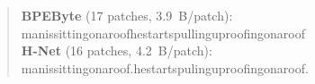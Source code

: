 \begin{quote}
\textbf{BPEByte} (17 patches, 3.9~B/patch):\\[1pt]
\allowbreak{}\bb{\textvisiblespace{}}\allowbreak{}m\allowbreak{}a\allowbreak{}n\allowbreak{}\bb{\textvisiblespace{}}\allowbreak{}i\allowbreak{}s\allowbreak{}\bb{\textvisiblespace{}}\allowbreak{}s\allowbreak{}i\allowbreak{}t\allowbreak{}t\allowbreak{}i\allowbreak{}n\allowbreak{}g\allowbreak{}\bb{\textvisiblespace{}}\allowbreak{}o\allowbreak{}n\allowbreak{}\bb{\textvisiblespace{}}\allowbreak{}a\allowbreak{}\bb{\textvisiblespace{}}\allowbreak{}r\allowbreak{}o\allowbreak{}o\allowbreak{}f\allowbreak{}\allowbreak{}\bb{\textvisiblespace{}}\allowbreak{}h\allowbreak{}e\allowbreak{}\bb{\textvisiblespace{}}\allowbreak{}s\allowbreak{}t\allowbreak{}a\allowbreak{}r\allowbreak{}t\allowbreak{}s\allowbreak{}\bb{\textvisiblespace{}}\allowbreak{}p\allowbreak{}u\allowbreak{}l\allowbreak{}l\allowbreak{}i\allowbreak{}n\allowbreak{}g\allowbreak{}\bb{\textvisiblespace{}}\allowbreak{}u\allowbreak{}p\allowbreak{}\bb{\textvisiblespace{}}\allowbreak{}r\allowbreak{}o\allowbreak{}o\allowbreak{}f\allowbreak{}i\allowbreak{}n\allowbreak{}g\allowbreak{}\bb{\textvisiblespace{}}\allowbreak{}o\allowbreak{}n\allowbreak{}\bb{\textvisiblespace{}}\allowbreak{}a\allowbreak{}\bb{\textvisiblespace{}}\allowbreak{}r\allowbreak{}o\allowbreak{}o\allowbreak{}f\allowbreak{}\allowbreak{}\\[6pt]
\textbf{H-Net} (16 patches, 4.2~B/patch):\\[1pt]
\allowbreak{}\bb{\textvisiblespace{}}\allowbreak{}m\allowbreak{}a\allowbreak{}n\allowbreak{}\bb{\textvisiblespace{}}\allowbreak{}i\allowbreak{}s\allowbreak{}\bb{\textvisiblespace{}}\allowbreak{}s\allowbreak{}i\allowbreak{}t\allowbreak{}t\allowbreak{}i\allowbreak{}n\allowbreak{}g\allowbreak{}\bb{\textvisiblespace{}}\allowbreak{}o\allowbreak{}n\allowbreak{}\bb{\textvisiblespace{}}\allowbreak{}a\allowbreak{}\bb{\textvisiblespace{}}\allowbreak{}r\allowbreak{}o\allowbreak{}o\allowbreak{}f\allowbreak{}.\allowbreak{}\bb{\textvisiblespace{}}\allowbreak{}h\allowbreak{}e\allowbreak{}\bb{\textvisiblespace{}}\allowbreak{}s\allowbreak{}t\allowbreak{}a\allowbreak{}r\allowbreak{}t\allowbreak{}s\allowbreak{}\bb{\textvisiblespace{}}\allowbreak{}p\allowbreak{}u\allowbreak{}\allowbreak{}l\allowbreak{}i\allowbreak{}n\allowbreak{}g\allowbreak{}\bb{\textvisiblespace{}}\allowbreak{}u\allowbreak{}p\allowbreak{}\bb{\textvisiblespace{}}\allowbreak{}r\allowbreak{}o\allowbreak{}o\allowbreak{}f\allowbreak{}i\allowbreak{}n\allowbreak{}g\allowbreak{}\bb{\textvisiblespace{}}\allowbreak{}o\allowbreak{}n\allowbreak{}\bb{\textvisiblespace{}}\allowbreak{}a\allowbreak{}\bb{\textvisiblespace{}}\allowbreak{}r\allowbreak{}o\allowbreak{}o\allowbreak{}f\allowbreak{}.\allowbreak{}\\[6pt]

\end{quote}
